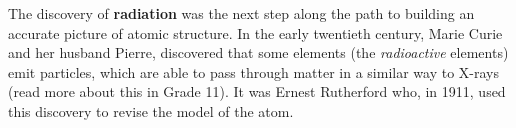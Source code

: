         \label{m38756*id254642}The discovery of \textbf{radiation} was the next step along the path to building an accurate picture of atomic structure. In the early twentieth century, Marie Curie and her husband Pierre,  discovered that some elements (the \textsl{radioactive} elements) emit particles, which are able to pass through matter in a similar way to X-rays (read more about this in Grade 11). It was Ernest Rutherford who, in 1911, used this discovery to revise the model of the atom.\par 
      \label{m38756*eip-956}



	
      \label{m38756*uid3}
